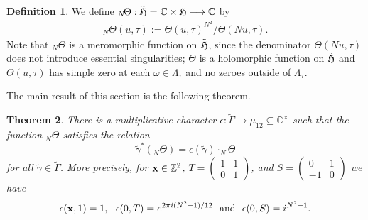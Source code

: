 \documentclass[12pt,amstex,amssymb]{article}
\theoremstyle{plain}
\newtheorem{theorem}{Theorem}[subsection]
\theoremstyle{definition}
\newtheorem{definition}[theorem]{Definition}
\def\lra{\longrightarrow}
\def\fH{{\frak H}}
\def\Z{{\mathbb Z}}
\def\C{{\mathbb C}}
\def\bx {{\bf x}}
\newcommand{\bea}{\begin{eqnarray}}
\newcommand{\eea}{\end{eqnarray}}
\newcommand{\ba}{\mathbf{a}}
\newcommand{\bb}{\mathbf{b}}
\begin{document}
\begin{definition} \label{mero}
	We define 
	$_{N}\!\Theta :\tilde \fH=\C \times \fH \lra \C$ by
	\bea \label{thetad}
	_{N}\!\Theta(u,\tau) :=  \Theta(u,\tau)^{N^2}/\Theta(Nu,\tau).
	\eea
Note that $_{N}\!\Theta$ is a meromorphic function on $\tilde \fH$, since the denominator $\Theta(Nu,\tau)$ does not introduce essential singularities; $\Theta$ is a holomorphic function on $\tilde \fH$ and $\Theta(u,\tau)$ has simple zero at each $\omega\in \Lambda_\tau$ and no zeroes outside of $\Lambda_\tau$. 

\end{definition}

\noindent
The main result of this section is the following theorem.

\begin{theorem}\label{vartheta:invariance}
	There is a multiplicative character $\epsilon : \tilde\Gamma \lra {\mathbb \mu}_{12}\subseteq \C^\times$ such that the function $_{N}\!\Theta$ satisfies the relation
	$$
	\tilde\gamma^\ast (_{N}\!\Theta) =\epsilon(\tilde\gamma)\cdot_{N}\!\Theta
	$$
	for all $\tilde\gamma \in \tilde\Gamma$.  More precisely, for $\bx\in \Z^2$,  $T=\begin{pmatrix}1&1\\0&1\end{pmatrix}$, and $S=\begin{pmatrix}0&1\\-1&0\end{pmatrix}$
	we have 
	$$
	\epsilon(\bx, 1) = 1,\ \  \epsilon(0, T) = e^{2\pi i(N^2-1)/12}\ \ \hbox{\rm and}\ \ \epsilon(0,S) = i^{N^2-1}.
	$$
\end{theorem}
\end{document}
